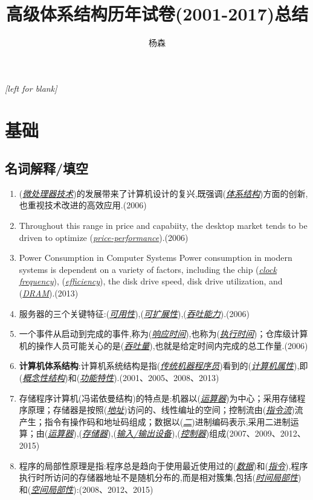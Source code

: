\documentclass[a4paper]{ctexart}
\newcommand{\blank}[1]{(\emph{\underline{#1}})}
\begin{document}
\title{高级体系结构历年试卷(2001-2017)总结}
\author{杨森}
\maketitle

\newpage
\textit{[left for blank]}
\newpage

\section{基础}
\subsection{名词解释/填空}
\begin{enumerate}
  \item (\emph{\underline{微处理器技术}})的发展带来了计算机设计的复兴,既强调(\emph{\underline{体系结构}})方面的创新,也重视技术改进的高效应用.(2006)
  \item Throughout this range in price and capabiity, the desktop market tends to be driven to optimize (\emph{\underline{price-performance}}).(2006)
  \item Power Consumption in Computer Systems Power consumption in modern systems is dependent on a variety of factors, including the chip \blank{clock frequency}, \blank{efficiency}, the disk drive speed, disk drive utilization, and \blank{DRAM}.(2013)
  \item 服务器的三个关键特征:(\emph{\underline{可用性}}),(\emph{\underline{可扩展性}}),(\emph{\underline{吞吐能力}}).(2006)
  \item 一个事件从启动到完成的事件,称为(\emph{\underline{响应时间}}),也称为(\emph{\underline{执行时间}})；仓库级计算机的操作人员可能关心的是(\emph{\underline{吞吐量}}),也就是给定时间内完成的总工作量.(2006)
  \item \textbf{计算机体系结构}:计算机系统结构是指\blank{传统机器程序员}看到的\blank{计算机属性},即\blank{概念性结构}和\blank{功能特性}.(2001、2005、2008、2013)
  \item 存储程序计算机(冯诺依曼结构)的特点是:机器以(\emph{\underline{运算器}})为中心；采用存储程序原理；存储器是按照(\emph{\underline{地址}})访问的、线性编址的空间；控制流由(\emph{\underline{指令流}})流产生；指令有操作码和地址码组成；数据以(\emph{\underline{二}})进制编码表示,采用二进制运算；由\blank{运算器},\blank{存储器},\blank{输入/输出设备},\blank{控制器}组成(2007、2009、2012、2015)
  \item 程序的局部性原理是指:程序总是趋向于使用最近使用过的(\emph{\underline{数据}})和(\emph{\underline{指令}}),程序执行时所访问的存储器地址不是随机分布的,而是相对簇集,包括(\emph{\underline{时间局部性}})和(\emph{\underline{空间局部性}}):(2008、2012、2015)

\end{enumerate}
\end{document}
